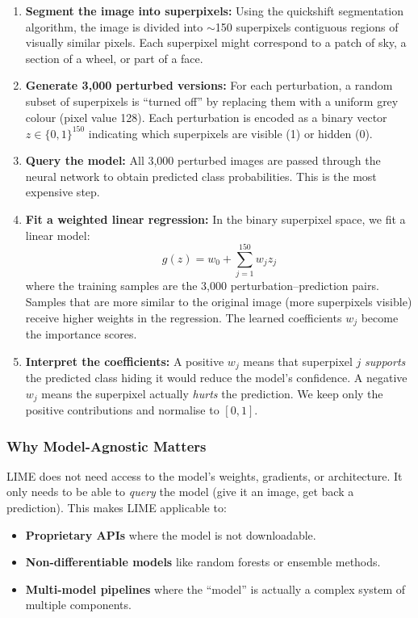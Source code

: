 \documentclass[12pt, a4paper]{article}
\begin{document}
\begin{enumerate}[leftmargin=*]
    \item \textbf{Segment the image into superpixels:}  Using the quickshift
          segmentation algorithm, the image is divided into $\sim$150
          superpixels contiguous regions of visually similar pixels.  Each
          superpixel might correspond to a patch of sky, a section of a
          wheel, or part of a face.

    \item \textbf{Generate 3{,}000 perturbed versions:}  For each perturbation,
          a random subset of superpixels is ``turned off'' by replacing them
          with a uniform grey colour (pixel value 128).  Each perturbation is
          encoded as a binary vector $z \in \{0, 1\}^{150}$ indicating which
          superpixels are visible (1) or hidden (0).

    \item \textbf{Query the model:}  All 3{,}000 perturbed images are passed
          through the neural network to obtain predicted class probabilities.
          This is the most expensive step.

    \item \textbf{Fit a weighted linear regression:}  In the binary
          superpixel space, we fit a linear model:
          \[
          g(z) = w_0 + \sum_{j=1}^{150} w_j z_j
          \]
          where the training samples are the 3{,}000 perturbation--prediction
          pairs.  Samples that are more similar to the original image (more
          superpixels visible) receive higher weights in the regression.  The
          learned coefficients $w_j$ become the importance scores.

    \item \textbf{Interpret the coefficients:}  A positive $w_j$ means that
          superpixel $j$ \emph{supports} the predicted class hiding it
          would reduce the model's confidence.  A negative $w_j$ means the
          superpixel actually \emph{hurts} the prediction.  We keep only the
          positive contributions and normalise to $[0, 1]$.
\end{enumerate}

\subsubsection{Why Model-Agnostic Matters}

LIME does not need access to the model's weights, gradients, or architecture.
It only needs to be able to \emph{query} the model (give it an image, get back
a prediction).  This makes LIME applicable to:
\begin{itemize}[leftmargin=*]
    \item \textbf{Proprietary APIs} where the model is not downloadable.
    \item \textbf{Non-differentiable models} like random forests or
          ensemble methods.
    \item \textbf{Multi-model pipelines} where the ``model'' is actually
          a complex system of multiple components.
\end{itemize}
\end{document}
